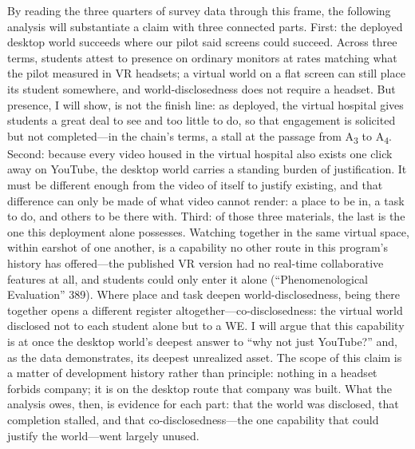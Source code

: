 
By reading the three quarters of survey data through this frame, the following
analysis will substantiate a claim with three connected parts.
First: the deployed desktop world succeeds where our pilot said screens could
succeed. Across three terms, students attest to presence on ordinary monitors at
rates matching what the pilot measured in VR headsets; a virtual world on a flat
screen can still place its student somewhere, and world-disclosedness does not
require a headset. But presence, I will show, is not the finish line: as
deployed, the virtual hospital gives students a great deal to see and too little
to do, so that engagement is solicited but not completed---in the chain's terms,
a stall at the passage from A\textsubscript{3} to A\textsubscript{4}. Second:
because every video housed in the virtual hospital also exists one click away on
YouTube, the desktop world carries a standing burden of justification. It must
be different enough from the video of itself to justify existing, and that
difference can only be made of what video cannot render: a place to be in, a
task to do, and others to be there with. Third: of those three materials, the
last is the one this deployment alone possesses. Watching together in the same
virtual space, within earshot of one another, is a capability no other route in
this program's history has offered---the published VR version had no real-time
collaborative features at all, and students could only enter it alone
(``Phenomenological Evaluation'' 389). Where place and task deepen
world-disclosedness, being there together opens a different register
altogether---co-disclosedness: the virtual world disclosed not to each student
alone but to a WE. I will argue that this capability is at once the desktop
world's deepest answer to ``why not just YouTube?'' and, as the data
demonstrates, its deepest unrealized asset. The scope of this claim is a matter
of development history rather than principle: nothing in a headset forbids
company; it is on the desktop route that company was built. What the analysis
owes, then, is evidence for each part: that the world was disclosed, that
completion stalled, and that co-disclosedness---the one capability that could
justify the world---went largely unused.

